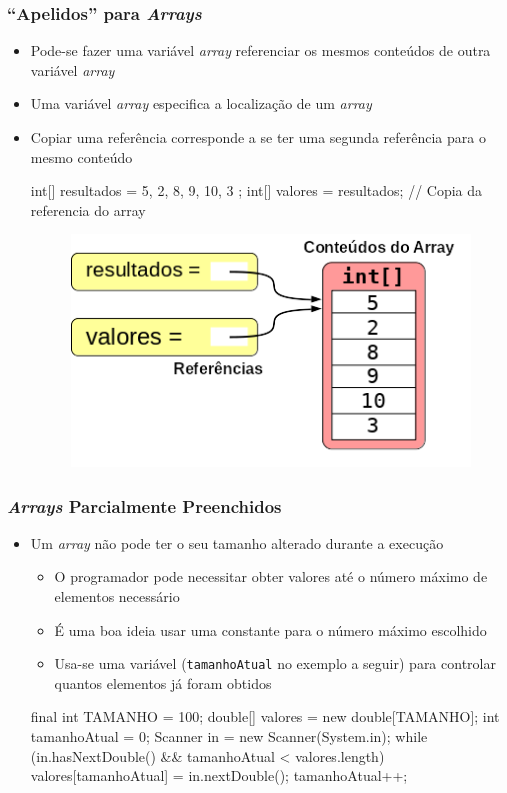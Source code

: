 \documentclass[xcolor={dvipsnames,table},aspectratio=169]{beamer}
\begin{document}
\begin{frame}[fragile]\frametitle{``Apelidos'' para \emph{Arrays}}
\begin{itemize}
	\item Pode-se fazer uma variável \emph{array} referenciar os mesmos conteúdos de outra variável \emph{array}
	\item Uma variável \emph{array} especifica a localização de um \emph{array}
	\item Copiar uma referência corresponde a se ter uma segunda referência para o mesmo conteúdo
{\footnotesize
\begin{javacode}
int[] resultados = { 5, 2, 8, 9, 10, 3 };
int[] valores = resultados;  // Copia da referencia do array
\end{javacode}
}
\begin{figure}[h]
	\includegraphics[height=0.3\paperheight,center]{pucrs-ep-fprog-unidade_06-arrays-laminas-apelidos_para_arrays.png}
\end{figure}
\end{itemize}
\end{frame}

\begin{frame}[fragile]\frametitle{\emph{Arrays} Parcialmente Preenchidos}
\begin{itemize}
	\item Um \emph{array} não pode ter o seu tamanho alterado durante a execução
	\begin{itemize}
		\item O programador pode necessitar obter valores até o número máximo de elementos necessário
		\item É uma boa ideia usar uma constante para o número máximo escolhido
		\item Usa-se uma variável (\texttt{tamanhoAtual} no exemplo a seguir) para controlar quantos elementos já foram obtidos
	\end{itemize}
{\footnotesize
\begin{javacode}
final int TAMANHO = 100;
double[] valores = new double[TAMANHO];
int tamanhoAtual = 0;
Scanner in = new Scanner(System.in);
while (in.hasNextDouble() && tamanhoAtual < valores.length) {
    valores[tamanhoAtual] = in.nextDouble();
    tamanhoAtual++;
}
\end{javacode}
}
\end{itemize}
\end{frame}
\end{document}
